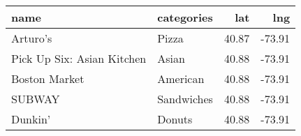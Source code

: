 \begin{tabular}{llrr}
\toprule
                       name &  categories &    lat &    lng \\
\midrule
                   Arturo's &       Pizza &  40.87 & -73.91 \\
 Pick Up Six: Asian Kitchen &       Asian &  40.88 & -73.91 \\
              Boston Market &    American &  40.88 & -73.91 \\
                     SUBWAY &  Sandwiches &  40.88 & -73.91 \\
                    Dunkin' &      Donuts &  40.88 & -73.91 \\
\bottomrule
\end{tabular}
